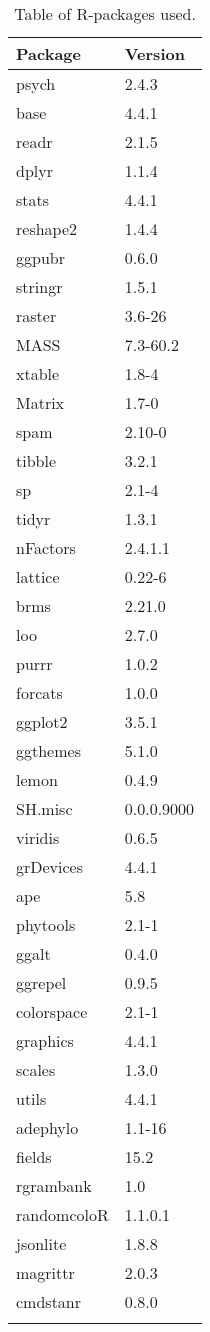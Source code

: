\begin{longtable}{p{2.5cm}p{2.5cm}}
  \toprule
Package & Version \\ 
  \midrule
psych & 2.4.3 \\ 
  base & 4.4.1 \\ 
  readr & 2.1.5 \\ 
  dplyr & 1.1.4 \\ 
  stats & 4.4.1 \\ 
  reshape2 & 1.4.4 \\ 
  ggpubr & 0.6.0 \\ 
  stringr & 1.5.1 \\ 
  raster & 3.6-26 \\ 
  MASS & 7.3-60.2 \\ 
  xtable & 1.8-4 \\ 
  Matrix & 1.7-0 \\ 
  spam & 2.10-0 \\ 
  tibble & 3.2.1 \\ 
  sp & 2.1-4 \\ 
  tidyr & 1.3.1 \\ 
  nFactors & 2.4.1.1 \\ 
  lattice & 0.22-6 \\ 
  brms & 2.21.0 \\ 
  loo & 2.7.0 \\ 
  purrr & 1.0.2 \\ 
  forcats & 1.0.0 \\ 
  ggplot2 & 3.5.1 \\ 
  ggthemes & 5.1.0 \\ 
  lemon & 0.4.9 \\ 
  SH.misc & 0.0.0.9000 \\ 
  viridis & 0.6.5 \\ 
  grDevices & 4.4.1 \\ 
  ape & 5.8 \\ 
  phytools & 2.1-1 \\ 
  ggalt & 0.4.0 \\ 
  ggrepel & 0.9.5 \\ 
  colorspace & 2.1-1 \\ 
  graphics & 4.4.1 \\ 
  scales & 1.3.0 \\ 
  utils & 4.4.1 \\ 
  adephylo & 1.1-16 \\ 
  fields & 15.2 \\ 
  rgrambank & 1.0 \\ 
  randomcoloR & 1.1.0.1 \\ 
  jsonlite & 1.8.8 \\ 
  magrittr & 2.0.3 \\ 
  cmdstanr & 0.8.0 \\ 
   \bottomrule
\caption{Table of R-packages used.} 
\label{r_package_table}
\end{longtable}
